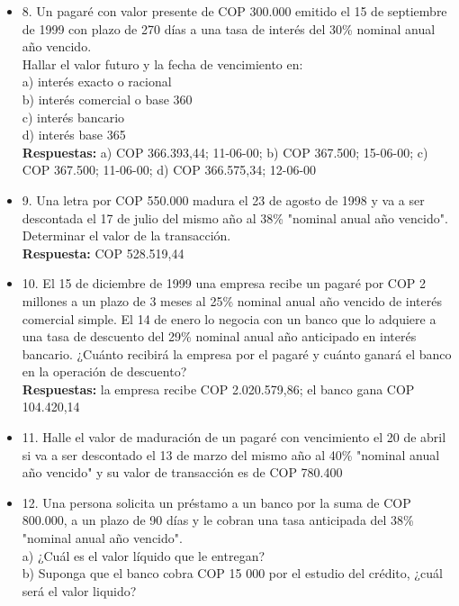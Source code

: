 \begin{itemize}
 \item 8. Un pagaré con valor presente de  COP  300.000 emitido el 15 de septiembre de 1999 con plazo de 270 días a una tasa de interés del 30\% nominal anual año vencido.\\
       Hallar el valor futuro y la fecha de vencimiento en:\\

       a) interés exacto o racional\\
       b) interés comercial o base 360\\
       c) interés bancario\\
       d) interés base 365\\
       \textbf{Respuestas:} a) COP 366.393,44; 11-06-00; b) COP 367.500; 15-06-00; c) COP 367.500; 11-06-00; d) COP 366.575,34; 12-06-00
       \medskip

 \item 9. Una letra por COP 550.000 madura el 23 de agosto de 1998 y va a ser descontada el 17 de julio del mismo año al 38\% "nominal anual año vencido". Determinar el valor de la transacción.\\
       \textbf{Respuesta:} COP 528.519,44
       \medskip

 \item 10. El 15 de diciembre de 1999 una empresa recibe un pagaré por  COP  2 millones a un plazo de 3 meses al 25\% nominal anual año vencido de interés comercial simple. El 14 de enero lo negocia con un banco que lo adquiere a una tasa de descuento del 29\% nominal anual año anticipado en interés bancario. ¿Cuánto recibirá la empresa por el pagaré y cuánto ganará el banco en la operación de descuento?\\

       \textbf{Respuestas:} la empresa recibe COP 2.020.579,86; el banco gana COP 104.420,14
       \medskip

 \item 11. Halle el valor de maduración de un pagaré con vencimiento el 20 de abril si va a ser descontado el 13 de marzo del mismo año al 40\% "nominal anual año vencido" y su valor de transacción es de  COP  780.400\\
       \medskip

 \item 12. Una persona solicita un préstamo a un banco por la suma de COP 800.000, a un plazo de 90 días y le cobran una tasa anticipada del 38\% "nominal anual año vencido".\\

       a) ¿Cuál es el valor líquido que le entregan?\\
       b) Suponga que el banco cobra COP 15 000 por el estudio del crédito, ¿cuál será el valor liquido?\\


\end{itemize}
